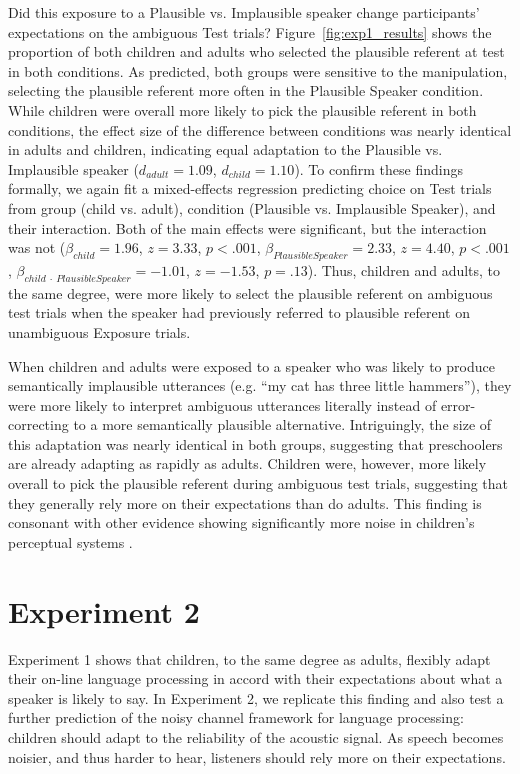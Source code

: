 \documentclass[man,floatsintext]{apa6}
\begin{document}
Did this exposure to a Plausible vs. Implausible speaker change participants' expectations on the ambiguous Test trials? Figure~\ref{fig:exp1_results} shows the proportion of both children and adults who selected the plausible referent at test in both conditions. As predicted, both groups were sensitive to the manipulation, selecting the plausible referent more often in the Plausible Speaker condition. While children were overall more likely to pick the plausible referent in both conditions, the effect size of the difference between conditions was nearly identical in adults and children, indicating equal adaptation to the Plausible vs. Implausible speaker ($d_{adult} =1.09$, $d_{child} = 1.10$). To confirm these findings formally, we again fit a mixed-effects regression predicting choice on Test trials from group (child vs. adult), condition (Plausible vs. Implausible Speaker), and their interaction. Both of the main effects were significant, but the interaction was not ($\beta_{child} = 1.96$,  $z = 3.33$, $p <.001$, $\beta_{Plausible Speaker} = 2.33$,  $z = 4.40$, $p <.001$,  $\beta_{child \: \cdot \: Plausible Speaker} = -1.01$,  $z = -1.53$, $p = .13$). Thus, children and adults, to the same degree, were more likely to select the plausible referent on ambiguous test trials when the speaker had previously referred to plausible referent on unambiguous Exposure trials.

When children and adults were exposed to a speaker who was likely to produce semantically implausible utterances (e.g. ``my cat has three little hammers''), they were more likely to interpret ambiguous utterances literally instead of error-correcting to a more semantically plausible alternative. Intriguingly, the size of this adaptation was nearly identical in both groups, suggesting that preschoolers are already adapting as rapidly as adults. Children were, however, more likely overall to pick the plausible referent during ambiguous test trials, suggesting that they generally rely more on their expectations than do adults. This finding is consonant with other evidence showing significantly more noise in children's perceptual systems \cite{neuman1983}.

\section{Experiment 2}

Experiment 1 shows that children, to the same degree as adults, flexibly adapt their on-line language processing in accord with their expectations about what a speaker is likely to say. In Experiment 2, we replicate this finding and also test a further prediction of the noisy channel framework for language processing: children should adapt to the reliability of the acoustic signal. As speech becomes noisier, and thus harder to hear, listeners should rely more on their expectations. 
\end{document}
